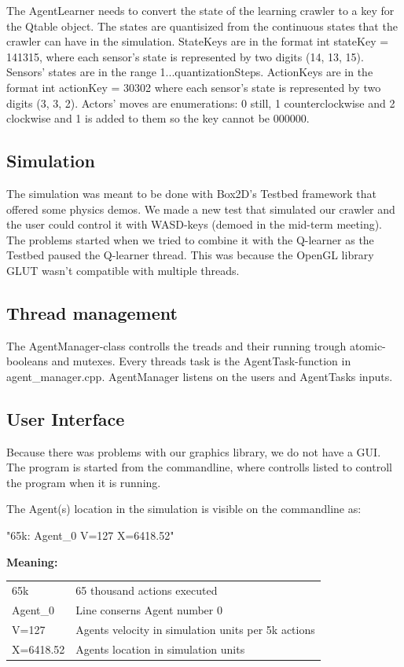 \documentclass{article}
\begin{document}
The AgentLearner needs to convert the state of the learning crawler to a key
for the Qtable object. The states are quantisized from the continuous states
that the crawler can have in the simulation. StateKeys are in the format
int stateKey = 141315, where each sensor's
state is represented by two digits (14, 13, 15). Sensors' states are
in the range 1...quantizationSteps. ActionKeys are in the format
int actionKey = 30302 where each sensor's
state is represented by two digits (3, 3, 2). Actors' moves are
enumerations: 0 still, 1 counterclockwise and 2 clockwise and 1 is
added to them so the key cannot be 000000.

\subsection{Simulation}
The simulation was meant to be done with Box2D's Testbed framework that 
offered some physics demos. We made a new test that simulated our crawler
and the user could control it with WASD-keys (demoed in the mid-term meeting).
The problems started when we tried to combine it with the Q-learner as the
Testbed paused the Q-learner thread. This was because the OpenGL library GLUT
wasn't compatible with multiple threads.

\subsection{Thread management}
The AgentManager-class controlls the treads and their running trough
atomic-booleans and mutexes. Every threads task is the AgentTask-function
in agent\_manager.cpp. AgentManager listens on the users and AgentTasks
inputs.

\subsection{User Interface}
Because there was problems with our graphics library, we do not have a GUI.
The program is started from the commandline, where controlls listed
to controll the program when it is running.

The Agent(s) location in the simulation is visible on the commandline as:

"65k: Agent\_0 V=127 X=6418.52"

\textbf{Meaning:}

\begin{tabular}{ll}
65k                     & 65 thousand actions executed \\
Agent\_0                & Line conserns Agent number 0 \\
V=127                   & Agents velocity in simulation units per 5k actions\\
X=6418.52               & Agents location in simulation units\\
\end{tabular}
\end{document}
